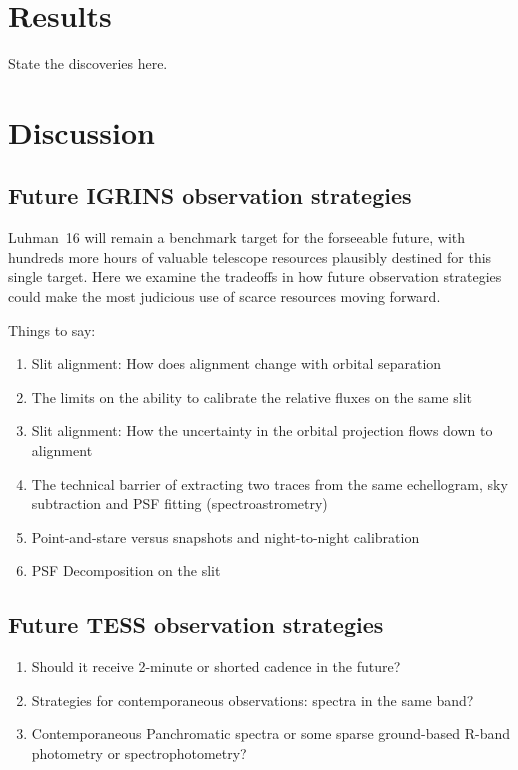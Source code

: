 \documentclass[modern]{aastex631}
\begin{document}
\section{Results}
State the discoveries here.

\section{Discussion}

\subsection{Future IGRINS observation strategies}
Luhman~16 will remain a benchmark target for the forseeable future, with hundreds more hours of valuable telescope resources plausibly destined for this single target.  Here we examine the tradeoffs in how future observation strategies could make the most judicious use of scarce resources moving forward.

Things to say:  
\begin{enumerate}
  \item Slit alignment: How does alignment change with orbital separation  
  \item The limits on the ability to calibrate the relative fluxes on the same slit  
  \item Slit alignment: How the uncertainty in the orbital projection flows down to alignment  
  \item The technical barrier of extracting two traces from the same echellogram, sky subtraction and PSF fitting (spectroastrometry)  
  \item Point-and-stare versus snapshots and night-to-night calibration 
  \item PSF Decomposition on the slit  
\end{enumerate}

\subsection{Future TESS observation strategies}
\begin{enumerate}
  \item Should it receive 2-minute or shorted cadence in the future? 
  \item Strategies for contemporaneous observations: spectra in the same band?  
  \item Contemporaneous Panchromatic spectra or some sparse ground-based R-band photometry or spectrophotometry?
\end{enumerate}
\end{document}
